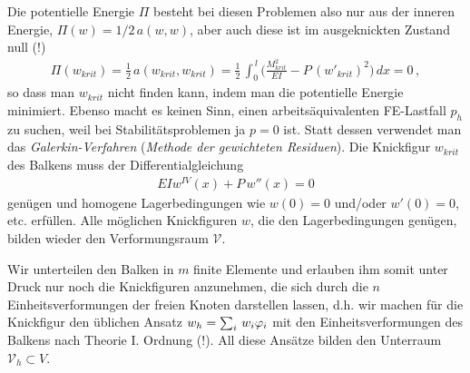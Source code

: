 Die potentielle Energie $\Pi$ besteht bei diesen Problemen also nur aus der inneren Energie, $\Pi(w) =
1/2\,a(w,w)$, aber auch diese ist im ausgeknickten Zustand null (!)
\begin{align}
\Pi(w_{krit}) = \frac{1}{2}\, a(w_{krit},w_{krit}) = \frac{1}{2}\,\int_0^{\,l}
\big(\frac{M^2_{krit}}{EI} - P\,(w'_{krit})^2\big)\,dx = 0 \,,
\end{align}
so dass man $w_{krit}$ nicht finden kann, indem man die potentielle Energie minimiert.
Ebenso macht es keinen Sinn, einen arbeits\"{a}quivalenten FE-Lastfall $p_h$ zu suchen, weil
bei Stabilit\"{a}tsproblemen ja $p = 0$ ist. Statt dessen verwendet man das {\em
Galerkin-Verfahren\/} ({\em Methode der gewichteten
Residuen\/}).  Die Knickfigur $w_{krit}$ des
Balkens muss der Differentialgleichung
\begin{align}\label{DGLThIIh}
EI w^{IV}(x) + P \,w''(x) = 0
\end{align}
gen\"{u}gen und homogene Lagerbedingungen wie $w(0) = 0$ und/oder $w'(0) = 0$, etc.
erf\"{u}llen. Alle m\"{o}glichen Knickfiguren $w$, die den Lagerbedingungen gen\"{u}gen, bilden
wieder den Verformungsraum $\mathcal{V}$.

Wir unterteilen den Balken in $m$ finite Elemente und erlauben ihm somit unter Druck nur
noch die Knickfiguren anzunehmen, die sich durch die $n$ Einheitsverformungen der freien
Knoten darstellen lassen, d.h. wir machen f\"{u}r die Knickfigur den \"{u}blichen Ansatz $w_h =
\sum_i\,w_i \varphi_i$ mit den Einheitsverformungen des Balkens nach Theorie I. Ordnung (!).
All diese Ans\"{a}tze bilden den Unterraum $\mathcal{V}_h \subset V$.

